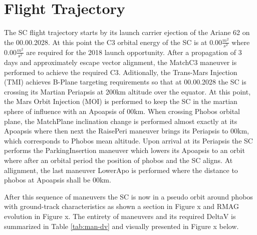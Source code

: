 
\section{Flight Trajectory}
The SC flight trajectory starts by its launch carrier ejection of the Ariane 62 on the 00.00.2028. At this point the C3 orbital energy of the SC is at $ 0.00 \frac{m^2}{s^2}$ where $ 0.00 \frac{m^2}{s^2}$ are required for the 2018 launch opportunity. After a propagation of 3 days and approximately escape vector alignment, the MatchC3 maneuver is performed to achieve the required C3. Aditionally, the Trans-Mars Injection (TMI) achieves B-Plane targeting requirements so that at 00.00.2028 the SC is crossing its Martian Periapsis at 200km altitude over the equator. At this point, the Mars Orbit Injection (MOI) is performed to keep the SC in the martian sphere of influence with an Apoapsis of 00km. When crossing Phobos orbital plane, the MatchPlane inclination change is performed almost exactly at its Apoapsis where then next the RaisePeri maneuver brings its Periapsis to 00km, which corresponds to Phobos mean altitude. Upon arrival at its Periapsis the SC performs the ParkingInsertion maneuver which lowers its Apoapsis to an orbit where after an orbital period the position of phobos and the SC aligns. At allignment, the last maneuver LowerApo is performed where the distance to phobos at Apoapsis shall be 00km.

After this sequence of maneuvers the SC is now in a pseudo orbit around phobos with ground-track characteristics as shown a section in Figure x and RMAG evolution in Figure x. The entirety of maneuvers and its required DeltaV is summarized in Table \ref{tab:man-dv} and visually presented in Figure x below.

